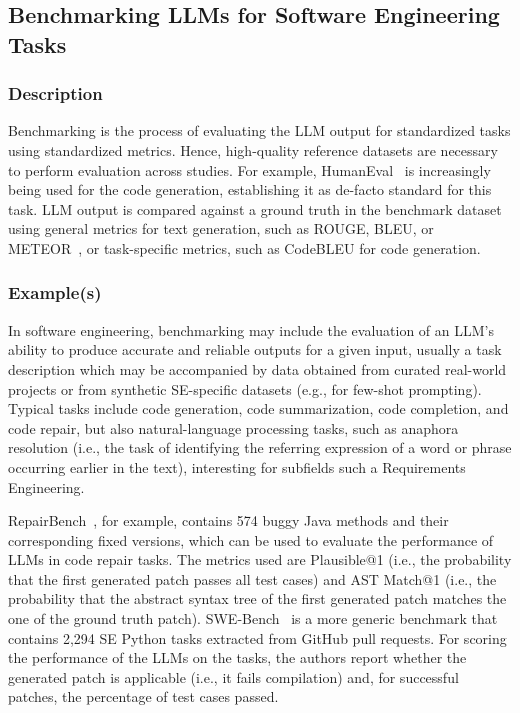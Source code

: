 \subsection{Benchmarking LLMs for Software Engineering Tasks}

\subsubsection{Description}

Benchmarking is the process of evaluating the LLM output for standardized tasks using standardized metrics.
Hence, high-quality reference datasets are necessary to perform evaluation across studies.
For example, HumanEval~\cite{DBLP:journals/corr/abs-2107-03374} is increasingly being used for the code generation, establishing it as de-facto standard for this task.   
LLM output is compared against a ground truth in the benchmark dataset using general metrics for text generation, such as ROUGE, BLEU, or METEOR~\cite{10.1145/3695988}, or task-specific metrics, such as CodeBLEU for code generation.

\subsubsection{Example(s)}

In software engineering, benchmarking may include the evaluation of an LLM's ability to produce accurate and reliable outputs for a given input, usually a task description which may be accompanied by data obtained from curated real-world projects or from synthetic SE-specific datasets (e.g., for few-shot prompting).
Typical tasks include code generation, code summarization, code completion, and code repair, but also natural-language processing tasks, such as anaphora resolution (i.e., the task of identifying the referring expression of a word or phrase occurring earlier in the text), interesting for subfields such a Requirements Engineering. 

RepairBench~\cite{silva2024repairbench}, for example, contains 574 buggy Java methods and their corresponding fixed versions, which can be used to evaluate the performance of LLMs in code repair tasks.
The metrics used are Plausible@1 (i.e., the probability that the first generated patch passes all test cases) and AST Match@1 (i.e., the probability that the abstract syntax tree of the first generated patch matches the one of the ground truth patch).
SWE-Bench~\cite{DBLP:conf/iclr/JimenezYWYPPN24} is a more generic benchmark that contains 2,294 SE Python tasks extracted from GitHub pull requests.
For scoring the performance of the LLMs on the tasks, the authors report whether the generated patch is applicable (i.e., it fails compilation) and, for successful patches, the percentage of test cases passed.

